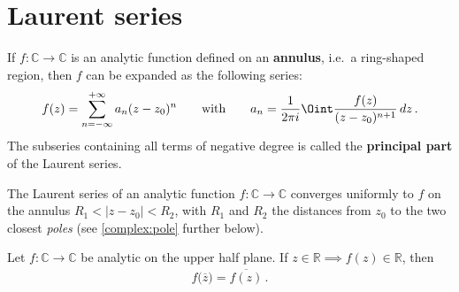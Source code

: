 \section{Laurent series}

    \begin{definition}\label{complex:laurent_series}
        If $f:\mathbb{C}\rightarrow\mathbb{C}$ is an analytic function defined on an \textbf{annulus}, i.e.~a ring-shaped region, then $f$ can be expanded as the following series:
        \begin{gather}
            f(z) = \sum^{+\infty}_{n=-\infty}a_n(z-z_0)^n \qquad\text{with}\qquad a_n = \frac{1}{2\pi i}\Oint\frac{f(z)}{(z-z_0)^{n+1}}\,dz\,.
        \end{gather}
        The subseries containing all terms of negative degree is called the \textbf{principal part} of the Laurent series.
    \end{definition}

    \begin{property}[Convergence]
        The Laurent series of an analytic function $f:\mathbb{C}\rightarrow\mathbb{C}$ converges uniformly to $f$ on the annulus $R_1 < |z-z_0| < R_2$, with $R_1$ and $R_2$ the distances from $z_0$ to the two closest \textit{poles} (see \cref{complex:pole} further below).
    \end{property}


    \begin{theorem}
        Let $f:\mathbb{C}\rightarrow\mathbb{C}$ be analytic on the upper half plane. If $z\in\mathbb{R}\implies f(z)\in\mathbb{R}$, then
        \begin{gather}
            f\bigl(\overline{z}\bigr) = \overline{f(z)}\,.
        \end{gather}
    \end{theorem}

